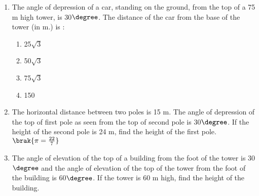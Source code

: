\begin{enumerate}
\item The angle of depression of a car, standing on the ground, from the top of a
75 m high tower, is 30$\degree$. The distance of the car from the base of the tower
(in m.) is : \\
 \begin{enumerate}
    \item 25$\sqrt{3}$\\
    \item 50$\sqrt{3}$\\
    \item 75$\sqrt{3}$\\
    \item 150
 \end{enumerate}
 \item The horizontal distance between two poles is 15 m. The angle of depression of the top of first pole as seen from the top of second pole is 30$\degree$. If the height of the second pole is 24 m, find the height of the first pole. $\brak{ \pi = \frac{22}{7}}$
 
\item The angle of elevation of the top of a building from the foot of the tower is 30$\degree$ and the angle of elevation of the top of the tower from the foot of the building is 60$\degree$. If the tower is 60 m high, find the height of the building. 
\end{enumerate}
